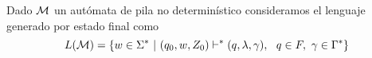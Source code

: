 \documentclass[tesis.tex]{subfiles}
\begin{document}
\begin{deff}
	Dado $\cal M$ un autómata de pila no determinístico consideramos el lenguaje generado por estado final como
	\begin{equation*}
		L( {\cal M}) = \{ w \in \Sigma^* \ | \ (q_0,w,Z_0) \vdash^* (q, \lambda, \gamma), \ \ q \in F, \ \gamma \in \Gamma^*      \}
	\end{equation*}
\end{deff}


\end{document}
